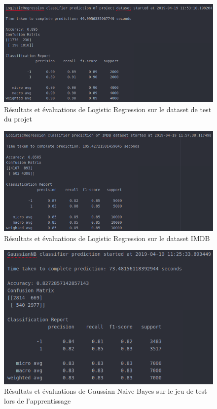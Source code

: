 \documentclass[12pt,a4paper]{report}
\theoremstyle{definition}
\begin{document}
\begin{appendices}
\begin{figure}[!ht]
  \centering
  \includegraphics[scale=0.5]{images/snapshots/predictions/logistic_regression/project_dataset_results.png}
  \caption{Résultats et évaluations de Logistic Regression sur le dataset de test du projet}
  \label{fig:lr_project_dataset}
\end{figure}

\begin{figure}[!ht]
  \centering
  \includegraphics[scale=0.5]{images/snapshots/predictions/logistic_regression/imdb_dataset_results.png}
  \caption{Résultats et évaluations de Logistic Regression sur le dataset IMDB}
  \label{fig:lr_imdb_dataset}
\end{figure}

\begin{figure}[!ht]
  \centering
  \includegraphics[scale=0.5]{images/snapshots/predictions/gaussian_naive_bayes/training_set_results.png}
  \caption{Résultats et évaluations de Gaussian Naive Bayes sur le jeu de test lors de l'apprentissage}
  \label{fig:gnb_fit_test}
\end{figure}


\end{appendices}
\end{document}
